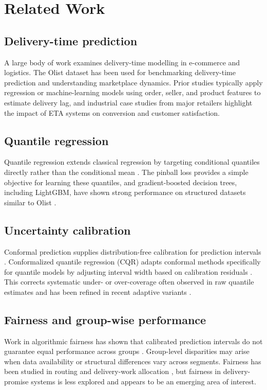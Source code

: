 \documentclass[12pt]{article}
\begin{document}
\section{Related Work}

\subsection{Delivery-time prediction}
A large body of work examines delivery-time modelling in e-commerce and logistics. The Olist dataset has been used for benchmarking delivery-time prediction and understanding marketplace dynamics. Prior studies typically apply regression or machine-learning models using order, seller, and product features to estimate delivery lag, and industrial case studies from major retailers highlight the impact of ETA systems on conversion and customer satisfaction.

\subsection{Quantile regression}
Quantile regression extends classical regression by targeting conditional quantiles directly rather than the conditional mean \citep{koenker1978,koenker2001}. The pinball loss provides a simple objective for learning these quantiles, and gradient-boosted decision trees, including LightGBM, have shown strong performance on structured datasets similar to Olist \citep{ke2017lightgbm}.

\subsection{Uncertainty calibration}
Conformal prediction supplies distribution-free calibration for prediction intervals \citep{vovk2005conformal,angelopoulos2021gentle}. Conformalized quantile regression (CQR) adapts conformal methods specifically for quantile models by adjusting interval width based on calibration residuals \citep{romano2019cqr}. This corrects systematic under- or over-coverage often observed in raw quantile estimates and has been refined in recent adaptive variants \citep{sousa2024adaptive}.

\subsection{Fairness and group-wise performance}
Work in algorithmic fairness has shown that calibrated prediction intervals do not guarantee equal performance across groups \citep{pleiss2017fairness,kleinberg2017impossibility}. Group-level disparities may arise when data availability or structural differences vary across segments. Fairness has been studied in routing and delivery-work allocation \citep{gupta2022fairfoody,martinez2024fairrouting}, but fairness in delivery-promise systems is less explored and appears to be an emerging area of interest.
\end{document}
